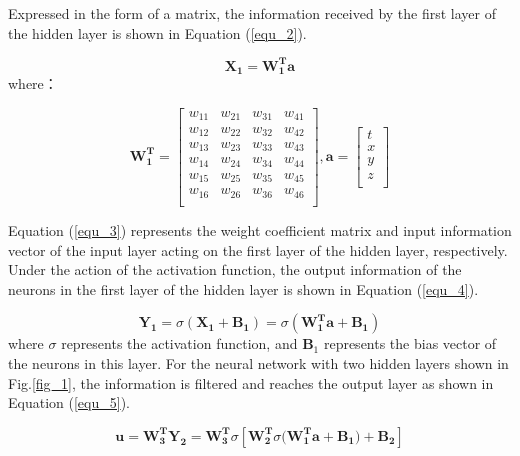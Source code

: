 \documentclass[10pt,journal,compsoc]{IEEEtran}
\begin{document}
Expressed in the form of a matrix, the information received by the first layer of the hidden layer is shown in Equation (\ref{equ_2}).


\begin{equation}
\mathbf{X_{1}} = \mathbf{W_{1}^{T}} \mathbf{a}
\label{equ_2}
\end{equation}
where：

\begin{equation}
\mathbf{W_{1}^{T}} = \begin{bmatrix}
w_{11} & w_{21} & w_{31} & w_{41} \\
w_{12} & w_{22} & w_{32} & w_{42} \\
w_{13} & w_{23} & w_{33} & w_{43} \\
w_{14} & w_{24} & w_{34} & w_{44} \\
w_{15} & w_{25} & w_{35} & w_{45} \\
w_{16} & w_{26} & w_{36} & w_{46} \\
\end{bmatrix},
\mathbf{a} = \begin{bmatrix}
t \\
x \\
y \\
z \\
\end{bmatrix}
\label{equ_3}
\end{equation}

Equation (\ref{equ_3}) represents the weight coefficient matrix and input information vector of the input layer acting on the first layer of the hidden layer, respectively. Under the action of the activation function, the output information of the neurons in the first layer of the hidden layer is shown in Equation (\ref{equ_4}).


\begin{equation}
\mathbf{Y_{1}} = \sigma \mathbf{(X_{1} + B_{1})} = \sigma(\mathbf{W_{1}^{T} a + B_{1}})
\label{equ_4}
\end{equation}
where $\sigma$ represents the activation function, and $\mathbf{B}_{1}$ represents the bias vector of the neurons in this layer. For the neural network with two hidden layers shown in Fig.\ref{fig_1}, the information is filtered and reaches the output layer as shown in Equation (\ref{equ_5}).

\begin{equation}
\mathbf{u} = \mathbf{W_{3}^{T} Y_{2}} = \mathbf{W_{3}^{T}} \sigma{[\mathbf{W_{2}^{T}} \sigma{(\mathbf{W_{1}^{T}a + \mathbf{B_{1}})}} + \mathbf{B_2}]}
\label{equ_5}
\end{equation}
\end{document}
